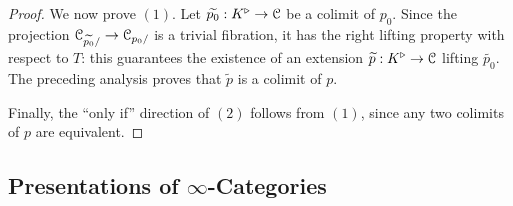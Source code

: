\begin{1.2.13 Limits and colimits}
\begin{proof}
We now prove $(1)$. Let $\widetilde{p_0}: K^{\triangleright} \rightarrow \operatorname{\mathcal{C}}$ be a colimit of $p_0$.
Since the projection $\operatorname{\mathcal{C}}_{\widetilde{p_0}/} \rightarrow \operatorname{\mathcal{C}}_{p_0/}$ is a trivial fibration, it has the right lifting property with respect to $T$: this guarantees the existence of an extension
$\widetilde{p}: K^{\triangleright} \rightarrow \operatorname{\mathcal{C}}$ lifting $\widetilde{p_0}$. The preceding analysis proves that $\widetilde{p}$ is a colimit of $p$.

Finally, the ``only if'' direction of $(2)$ follows from $(1)$, since any two colimits of $p$ are equivalent.
\end{proof}
\end{1.2.13 Limits and colimits}
\subsection{Presentations of $\infty$-Categories}
